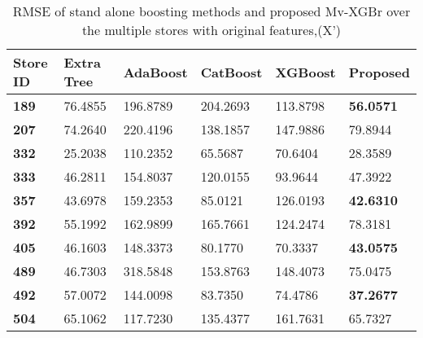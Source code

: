 \begin{table*}[]
\centering
\setlength{\tabcolsep}{3pt}
 {\renewcommand{\arraystretch}{1}%
\caption{RMSE of stand alone boosting methods and proposed Mv-XGBr over the multiple stores with original features,(X')}
\label{tab:my-table}
\begin{tabular}{llllll}
\hline \textbf{Store ID} & \textbf{Extra Tree} & \textbf{AdaBoost} & \textbf{CatBoost} & \textbf{XGBoost} & \textbf{Proposed}    \\ \hline

\textbf{189}   & 76.4855             & 196.8789                      & 204.2693                      & 113.8798                     & \textbf{56.0571}
           \\
\textbf{207}   & 74.2640             & 220.4196                      & 138.1857                      & 147.9886                     & 79.8944  \\
\textbf{332}   & 25.2038             & 110.2352                      & 65.5687                       & 70.6404                      & 28.3589           \\
\textbf{333}   & 46.2811             & 154.8037                      & 120.0155                      & 93.9644                      & 47.3922           \\
\textbf{357}   & 43.6978             & 159.2353                      & 85.0121                       & 126.0193                     & \textbf{42.6310 }        \\
\textbf{392}   & 55.1992             & 162.9899                      & 165.7661                      & 124.2474                     & 78.3181           \\
\textbf{405}   & 46.1603             & 148.3373                      & 80.1770                       & 70.3337                      & \textbf{43.0575}           \\
\textbf{489}   & 46.7303             & 318.5848                      & 153.8763                      & 148.4073                     & 75.0475         \\
\textbf{492}   & 57.0072             & 144.0098                      & 83.7350                       & 74.4786                      & \textbf{37.2677}  \\
\textbf{504}   & 65.1062             & 117.7230                      & 135.4377                      & 161.7631                     & 65.7327          \\ \hline
\end{tabular}%
}
\end{table*}

